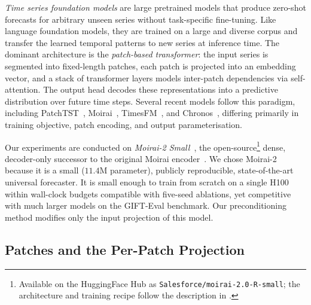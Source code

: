 \documentclass[11pt]{article}
\theoremstyle{plain}
\theoremstyle{definition}
\theoremstyle{remark}
\begin{document}
\emph{Time series foundation models} are large pretrained models that produce zero-shot forecasts for arbitrary unseen series without task-specific fine-tuning. Like language foundation models, they are trained on a large and diverse corpus and transfer the learned temporal patterns to new series at inference time. The dominant architecture is the \emph{patch-based transformer}: the input series is segmented into fixed-length patches, each patch is projected into an embedding vector, and a stack of transformer layers models inter-patch dependencies via self-attention. The output head decodes these representations into a predictive distribution over future time steps. Several recent models follow this paradigm, including PatchTST~\citep{nie2023patchtst}, Moirai~\citep{woo2024unified}, TimesFM~\citep{das2024decoder}, and Chronos~\citep{ansari2024chronos}, differing primarily in training objective, patch encoding, and output parameterisation.

Our experiments are conducted on \emph{Moirai-2 Small}~\citep{liu2024moirai2}, the open-source\footnote{Available on the HuggingFace Hub as \texttt{Salesforce/moirai-2.0-R-small}; the architecture and training recipe follow the description in \citet{liu2024moirai2}.} dense, decoder-only successor to the original Moirai encoder~\citep{woo2024unified}. We chose Moirai-2 because it is a small ($11.4$M parameter), publicly reproducible, state-of-the-art universal forecaster. It is small enough to train from scratch on a single H100 within wall-clock budgets compatible with five-seed ablations, yet competitive with much larger models on the GIFT-Eval benchmark. Our preconditioning method modifies only the input projection of this model.

\subsection{Patches and the Per-Patch Projection}
\label{sec:patches}
\end{document}
